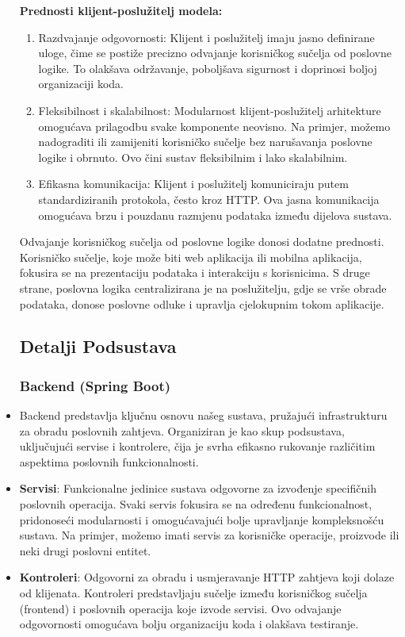 \begin{itemize}
\textbf{Prednosti klijent-poslužitelj modela:}

\begin{enumerate}
    \item Razdvajanje odgovornosti: Klijent i poslužitelj imaju jasno definirane uloge, čime se postiže precizno odvajanje korisničkog sučelja od poslovne logike. To olakšava održavanje, poboljšava sigurnost i doprinosi boljoj organizaciji koda.
    \item Fleksibilnost i skalabilnost: Modularnost klijent-poslužitelj arhitekture omogućava prilagodbu svake komponente neovisno. Na primjer, možemo nadograditi ili zamijeniti korisničko sučelje bez narušavanja poslovne logike i obrnuto. Ovo čini sustav fleksibilnim i lako skalabilnim.
    \item Efikasna komunikacija: Klijent i poslužitelj komuniciraju putem standardiziranih protokola, često kroz HTTP. Ova jasna komunikacija omogućava brzu i pouzdanu razmjenu podataka između dijelova sustava.
\end{enumerate}
 
Odvajanje korisničkog sučelja od poslovne logike donosi dodatne prednosti. Korisničko sučelje, koje može biti web aplikacija ili mobilna aplikacija, fokusira se na prezentaciju podataka i interakciju s korisnicima. S druge strane, poslovna logika centralizirana je na poslužitelju, gdje se vrše obrade podataka, donose poslovne odluke i upravlja cjelokupnim tokom aplikacije. 

\subsection*{Detalji Podsustava}
\subsubsection*{Backend (Spring Boot)}
\item Backend predstavlja ključnu osnovu našeg sustava, pružajući infrastrukturu za obradu poslovnih zahtjeva. Organiziran je kao skup podsustava, uključujući servise i kontrolere, čija je svrha efikasno rukovanje različitim aspektima poslovnih funkcionalnosti.

 \item  \textbf{Servisi}: Funkcionalne jedinice sustava odgovorne za izvođenje specifičnih poslovnih operacija. Svaki servis fokusira se na određenu funkcionalnost, pridonoseći modularnosti i omogućavajući bolje upravljanje kompleksnošću sustava. Na primjer, možemo imati servis za korisničke operacije, proizvode ili neki drugi poslovni entitet.
 \item \textbf{Kontroleri}: Odgovorni za obradu i usmjeravanje HTTP zahtjeva koji dolaze od klijenata. Kontroleri predstavljaju sučelje između korisničkog sučelja (frontend) i poslovnih operacija koje izvode servisi. Ovo odvajanje odgovornosti omogućava bolju organizaciju koda i olakšava testiranje.




\end{itemize}
